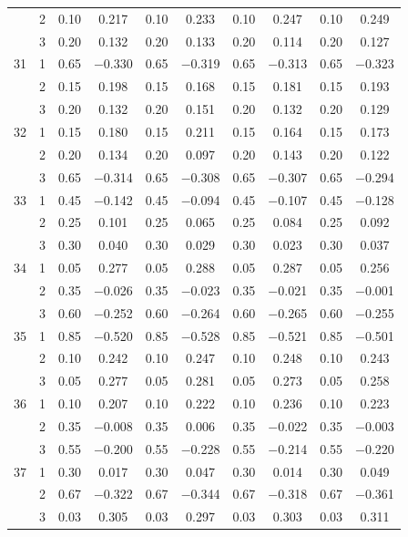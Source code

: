 \begin{longtable}{llcccccccc}
   & 2 & 0.10 & 0.217 & 0.10 & 0.233 & 0.10 & 0.247 & 0.10 & 0.249 \\ 
   & 3 & 0.20 & 0.132 & 0.20 & 0.133 & 0.20 & 0.114 & 0.20 & 0.127 \\ 
  31 & 1 & 0.65 & $-$0.330 & 0.65 & $-$0.319 & 0.65 & $-$0.313 & 0.65 & $-$0.323 \\ 
   & 2 & 0.15 & 0.198 & 0.15 & 0.168 & 0.15 & 0.181 & 0.15 & 0.193 \\ 
   & 3 & 0.20 & 0.132 & 0.20 & 0.151 & 0.20 & 0.132 & 0.20 & 0.129 \\ 
  32 & 1 & 0.15 & 0.180 & 0.15 & 0.211 & 0.15 & 0.164 & 0.15 & 0.173 \\ 
   & 2 & 0.20 & 0.134 & 0.20 & 0.097 & 0.20 & 0.143 & 0.20 & 0.122 \\ 
   & 3 & 0.65 & $-$0.314 & 0.65 & $-$0.308 & 0.65 & $-$0.307 & 0.65 & $-$0.294 \\ 
  33 & 1 & 0.45 & $-$0.142 & 0.45 & $-$0.094 & 0.45 & $-$0.107 & 0.45 & $-$0.128 \\ 
   & 2 & 0.25 & 0.101 & 0.25 & 0.065 & 0.25 & 0.084 & 0.25 & 0.092 \\ 
   & 3 & 0.30 & 0.040 & 0.30 & 0.029 & 0.30 & 0.023 & 0.30 & 0.037 \\ 
  34 & 1 & 0.05 & 0.277 & 0.05 & 0.288 & 0.05 & 0.287 & 0.05 & 0.256 \\ 
   & 2 & 0.35 & $-$0.026 & 0.35 & $-$0.023 & 0.35 & $-$0.021 & 0.35 & $-$0.001 \\ 
   & 3 & 0.60 & $-$0.252 & 0.60 & $-$0.264 & 0.60 & $-$0.265 & 0.60 & $-$0.255 \\ 
  35 & 1 & 0.85 & $-$0.520 & 0.85 & $-$0.528 & 0.85 & $-$0.521 & 0.85 & $-$0.501 \\ 
   & 2 & 0.10 & 0.242 & 0.10 & 0.247 & 0.10 & 0.248 & 0.10 & 0.243 \\ 
   & 3 & 0.05 & 0.277 & 0.05 & 0.281 & 0.05 & 0.273 & 0.05 & 0.258 \\ 
  36 & 1 & 0.10 & 0.207 & 0.10 & 0.222 & 0.10 & 0.236 & 0.10 & 0.223 \\ 
   & 2 & 0.35 & $-$0.008 & 0.35 & 0.006 & 0.35 & $-$0.022 & 0.35 & $-$0.003 \\ 
   & 3 & 0.55 & $-$0.200 & 0.55 & $-$0.228 & 0.55 & $-$0.214 & 0.55 & $-$0.220 \\ 
  37 & 1 & 0.30 & 0.017 & 0.30 & 0.047 & 0.30 & 0.014 & 0.30 & 0.049 \\ 
   & 2 & 0.67 & $-$0.322 & 0.67 & $-$0.344 & 0.67 & $-$0.318 & 0.67 & $-$0.361 \\ 
   & 3 & 0.03 & 0.305 & 0.03 & 0.297 & 0.03 & 0.303 & 0.03 & 0.311 \\ 

\end{longtable}
